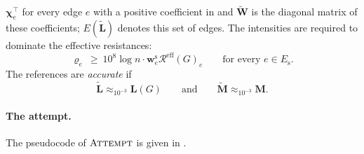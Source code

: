 \documentclass[11pt]{article}
\theoremstyle{remark}
\newcommand{\cchi}{{\boldsymbol\chi}}
\newcommand{\LL}{\mathbf L}
\newcommand{\LLtil}{{\widetilde{\LL}}}
\newcommand{\MM}{\mathbf M}
\newcommand{\MMtil}{{\widetilde{\MM}}}
\newcommand{\ww}{\mathbf w}
\newcommand{\WW}{\mathbf W}
\newcommand{\WWtil}{{\widetilde{\WW}}}
\newcommand{\Rcal}{\mathcal{R}}
\newcommand{\Reff}{\Rcal^{\mathrm{eff}}}
\begin{document}
$\cchi_e^{\top}$ for every edge $e$ with a positive coefficient in
 and $\WWtil$ is the diagonal matrix of these
coefficients; $E(\LLtil)$ denotes this set of edges.
The intensities are required to dominate the effective resistances:
\begin{equation}\label{eq:intensity}
\varrho_e\ \ge\ 10^{8}\log n\cdot\ww^{\mathrm{s}}_e\Reff(G)_e
\qquad\text{for every }e\in E_{\mathrm{s}} .
\end{equation}
The references are \emph{accurate} if
\begin{equation}\label{eq:accurate}
\LLtil\approx_{10^{-3}}\LL(G)
\qquad\text{and}\qquad
\MMtil\approx_{10^{-3}}\MM .
\end{equation}

\paragraph{The attempt.}
The pseudocode of $\textsc{Attempt}$ is given in .
\end{document}
